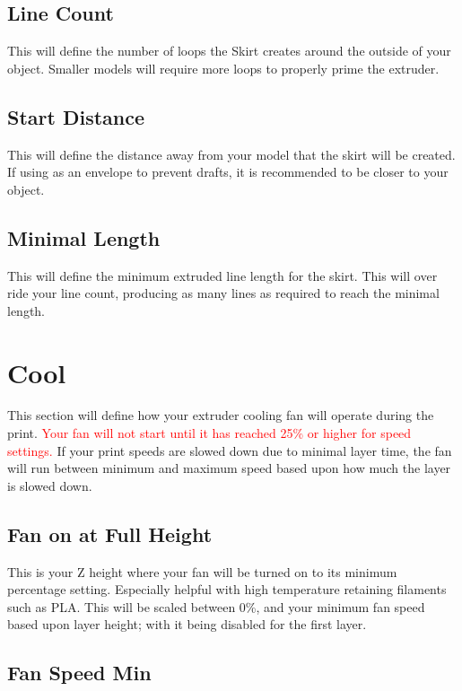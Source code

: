 \subsection{Line Count}
This will define the number of loops the Skirt creates around the outside of your object. Smaller models will require more loops to properly prime the extruder.

\subsection{Start Distance}
This will define the distance away from your model that the skirt will be created. If using as an envelope to prevent drafts, it is recommended to be closer to your object.

\subsection{Minimal Length}
This will define the minimum extruded line length for the skirt. This will over ride your line count, producing as many lines as required to reach the minimal length.

\section{Cool}
This section will define how your extruder cooling fan will operate during the print. \textcolor{red}{Your fan will not start until it has reached 25\% or higher for speed settings.} If your print speeds are slowed down due to minimal layer time, the fan will run between minimum and maximum speed based upon how much the layer is slowed down.

\subsection{Fan on at Full Height}
This is your Z height where your fan will be turned on to its minimum percentage setting. Especially helpful with high temperature retaining filaments such as PLA. This will be scaled between 0\%, and your minimum fan speed based upon layer height; with it being disabled for the first layer.

\subsection{Fan Speed Min}

